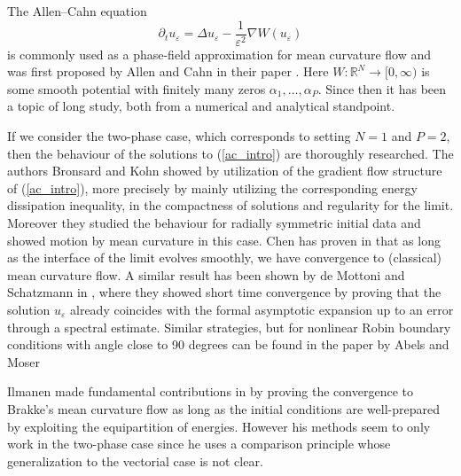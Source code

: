The Allen--Cahn equation
\begin{equation}
	\label{ac_intro}
	\partial_{ t } u_{ \varepsilon }
	=
	\Delta u_{ \varepsilon }
	-
	\frac{ 1 }{ \varepsilon^{ 2 } }
	\nabla W ( u_{ \varepsilon } )
\end{equation}
is commonly used as a phase-field approximation for mean curvature flow and was 
first proposed by Allen and Cahn in their paper 
\cite{allen_cahn_microscopig_theory_for_antiphase_boundary_motion}. Here $ W 
\colon \mathbb{ R }^{ N } \to [ 0 , \infty ) $ is some smooth potential with 
finitely many zeros $ \alpha_{ 1 } , \dotsc, \alpha_{ P } $.
Since then it has been a topic of long study, both from a numerical and 
analytical standpoint. 

If we consider the two-phase case, which corresponds to setting $ N = 1 $ and $ 
P = 2 $, then 
the behaviour of the solutions to (\ref{ac_intro}) are thoroughly researched.
The authors Bronsard and Kohn showed by utilization of the gradient flow 
structure of (\ref{ac_intro}), more precisely by mainly utilizing the 
corresponding energy dissipation inequality, in 
\cite{bronsard_kohn_motion_by_mean_curvature_as_singular_limit} the compactness 
of solutions and regularity for the limit. Moreover they studied the behaviour 
for radially symmetric initial data and showed motion by mean curvature in this 
case. 
Chen has proven in 
\cite{chen_generation_and_propagation_of_interfaces_for_reaction_diffusion_equations}
that as long as the interface of the limit evolves smoothly, we have 
convergence to (classical) mean curvature flow. A similar result has been shown 
by de Mottoni and Schatzmann in 
\cite{de_mottoni_schatzmann_geometrical_evolution_of_developed_interfaces}, 
where they showed short time convergence by proving that the solution $ u_{ 
\varepsilon } $ already coincides with the formal asymptotic expansion up to an 
error through a spectral estimate. Similar strategies, but for nonlinear Robin 
boundary conditions with angle close to 90 degrees can be found in the paper
\cite{abels_moser_convergence_of_ac_with_nonlinear_robin_boundary_condition_to_mcf}
 by Abels 
and Moser

Ilmanen made fundamental contributions in 
\cite{ilmanen_convergence_of_ac_to_brakkes_mcf} by proving the convergence to 
Brakke's mean curvature flow as long as the initial conditions are 
well-prepared by exploiting the equipartition of energies. However his methods 
seem to only work in the two-phase case since he uses a comparison principle 
whose generalization to the vectorial case is not clear.

